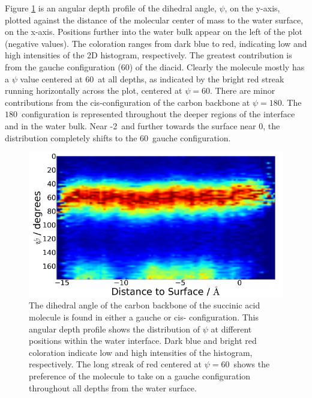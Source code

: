 Figure \ref{fig:dihedral} is an angular depth profile of the dihedral angle, $\psi$, on the y-axis, plotted against the distance of the molecular center of mass to the water surface, on the x-axis. Positions further into the water bulk appear on the left of the plot (negative values). The coloration ranges from dark blue to red, indicating low and high intensities of the 2D histogram, respectively. The greatest contribution is from the gauche configuration (60\textdegree) of the diacid. Clearly the molecule mostly has a $\psi$ value centered at 60\textdegree~at all depths, as indicated by the bright red streak running horizontally across the plot, centered at $\psi=60$\textdegree. There are minor contributions from the cis-configuration of the carbon backbone at $\psi = 180$\textdegree. The $180$\textdegree~configuration is represented throughout the deeper regions of the interface and in the water bulk. Near -2\angs~and further towards the surface near 0\angs, the distribution completely shifts to the $60$\textdegree~gauche configuration.


\begin{figure}[h!]
	\begin{center}
		\includegraphics[scale=1.0]{images/dihedral/dihedral-small.png}
		\caption{The dihedral angle of the carbon backbone of the succinic acid molecule is found in either a gauche or cis- configuration. This angular depth profile shows the distribution of $\psi$ at different positions within the water interface. Dark blue and bright red coloration indicate low and high intensities of the histogram, respectively. The long streak of red centered at $\psi=60$\textdegree~shows the preference of the molecule to take on a gauche configuration throughout all depths from the water surface.}
		\label{fig:dihedral}
	\end{center}
\end{figure}


